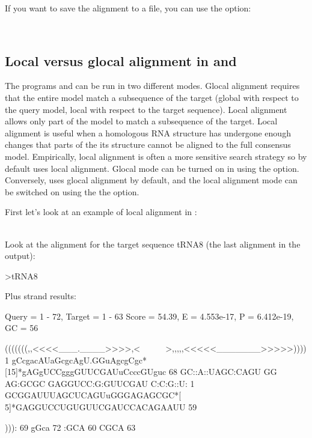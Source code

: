 If you want to save the alignment to a file, you can use the 
option:

\\

\subsection{Local versus glocal alignment in  and }

The programs  and  can be run in two
different modes. Glocal alignment requires that the entire model match
a subsequence of the target (global with respect to the query model,
local with respect to the target sequence). Local alignment allows
only part of the model to match a subsequence of the target. Local
alignment is useful when a homologous RNA structure has undergone
enough changes that parts of the its structure cannot be aligned to
the full consensus model. Empirically, local alignment is often a more
sensitive search strategy so by default  uses local
alignment. Glocal mode can be turned on in  using the
 option. Conversely,  uses glocal alignment by
default, and the local alignment mode can be switched on using the the
 option.

First let's look at an example of local alignment in :

\\

Look at the alignment for the target sequence tRNA8 (the last alignment in the output): 

{\samepage
\begin{sreoutput}
>tRNA8

  Plus strand results:

 Query = 1 - 72, Target = 1 - 63
 Score = 54.39, E = 4.553e-17, P = 6.412e-19, GC =  56

           (((((((,,<<<<___.____>>>>,<~~~~~~>,,,,,<<<<<_______>>>>>))))
         1 gCcgacAUaGcgcAgU.GGuAgcgCgc*[15]*gAGgUCCgggGUUCGAUuCcccGUguc 68      
           GC::A::UAGC:CAGU GG AG:GCGC      GAGGUCC:G:GUUCGAU C:C:G::U:
         1 GCGGAUUUAGCUCAGUuGGGAGAGCGC*[ 5]*GAGGUCCUGUGUUCGAUCCACAGAAUU 59      

           ))):
        69 gGca 72      
           :GCA
        60 CGCA 63      
\end{sreoutput}
}

